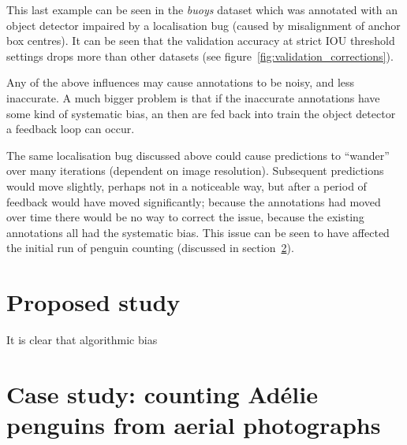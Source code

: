 This last example can be seen in the \emph{buoys} dataset which was annotated with an object detector impaired by a localisation bug (caused by misalignment of anchor box centres). It can be seen that the validation accuracy at strict \gls{IOU} threshold settings drops more than other datasets (see figure~\ref{fig:validation_corrections}).   

Any of the above influences may cause annotations to be noisy, and less inaccurate. A much bigger problem is that if the inaccurate annotations have some kind of systematic bias, an then are fed back into train the object detector a feedback loop can occur. 

The same localisation bug discussed above could cause predictions to ``wander'' over many iterations (dependent on image resolution). Subsequent predictions would move slightly, perhaps not in a noticeable way, but after a period of feedback would have moved significantly; because the annotations had moved over time there would be no way to correct the issue, because the existing annotations all had the systematic bias. This issue can be seen to have affected the initial run of penguin counting (discussed in section~\ref{sec:case_penguins}).   


\section{Proposed study}
\label{sec:proposed_study}

It is clear that algorithmic bias 


\section{Case study: counting Adélie penguins from aerial photographs}
\label{sec:case_penguins}

